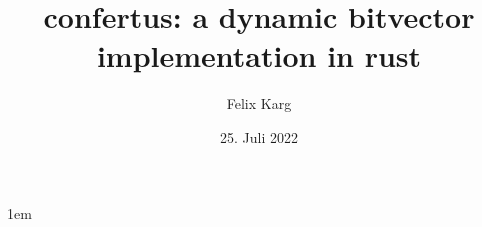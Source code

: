 \usepackage{graphicx}
\usepackage[export]{adjustbox}
\usepackage{multicol}
\usepackage{bibentry}
\usepackage{subcaption}
\usepackage{pdfpcnotes}
\usepackage{fancyvrb}
\usepackage{xcolor}

\usepackage{xcolor}
\usepackage{caption}
\usepackage[font={small,color=ocre},labelformat=empty]{caption}


\usepackage[outputdir={}]{minted}


\grouplogo{}


\title[confertus]{confertus: a dynamic bitvector implementation in rust}
\author[Felix Karg]{Felix Karg}

\date[25.\,07.\,2022]{25. Juli 2022}


\usepackage[citestyle=alphabetic,bibstyle=numeric,hyperref,backend=biber]{biblatex}



% 
\bibhang1em



\newcommand\blfootnote[1]{%
  \begingroup
  \renewcommand\thefootnote{}\footnote{\color{ocre}#1}%
  \addtocounter{footnote}{-1}%
  \endgroup
}

\newcommand\todo[1]{{\color{red}\textbf{TODO: #1}}}







